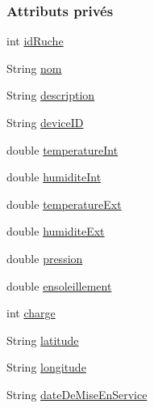 \subsubsection*{Attributs privés}
\begin{DoxyCompactItemize}
\item 
int \hyperlink{classfr_1_1campus_1_1laurainc_1_1honeybee_1_1_ruche_aee4d51dd1634b799427d89e168cdadf4}{id\+Ruche}
\item 
String \hyperlink{classfr_1_1campus_1_1laurainc_1_1honeybee_1_1_ruche_ae18dd003de10a89841422fd96b1139d7}{nom}
\item 
String \hyperlink{classfr_1_1campus_1_1laurainc_1_1honeybee_1_1_ruche_ae56a8481dac2ac5b127c0c9c62f00fe3}{description}
\item 
String \hyperlink{classfr_1_1campus_1_1laurainc_1_1honeybee_1_1_ruche_aa9f9b410923f3c8b037c2c359a67a132}{device\+ID}
\item 
double \hyperlink{classfr_1_1campus_1_1laurainc_1_1honeybee_1_1_ruche_aa8c8bbb640a5e445ca1d67f97e0f99b0}{temperature\+Int}
\item 
double \hyperlink{classfr_1_1campus_1_1laurainc_1_1honeybee_1_1_ruche_ad56a25b2e432592a20a5f7f4347f92f9}{humidite\+Int}
\item 
double \hyperlink{classfr_1_1campus_1_1laurainc_1_1honeybee_1_1_ruche_aabdc13a8650aed77ee5497236e79174b}{temperature\+Ext}
\item 
double \hyperlink{classfr_1_1campus_1_1laurainc_1_1honeybee_1_1_ruche_affacf72018828f470b5c69c1cc4f06a6}{humidite\+Ext}
\item 
double \hyperlink{classfr_1_1campus_1_1laurainc_1_1honeybee_1_1_ruche_a73ddf7686cdd056fe7dc4b249f6ada86}{pression}
\item 
double \hyperlink{classfr_1_1campus_1_1laurainc_1_1honeybee_1_1_ruche_aebfc51ed0e12be0dddc7675884a8129b}{ensoleillement}
\item 
int \hyperlink{classfr_1_1campus_1_1laurainc_1_1honeybee_1_1_ruche_adf68ff1828b2eaa02c8411a9c5727bf9}{charge}
\item 
String \hyperlink{classfr_1_1campus_1_1laurainc_1_1honeybee_1_1_ruche_a6898723eb97e6f32cbf2c63032f8aec4}{latitude}
\item 
String \hyperlink{classfr_1_1campus_1_1laurainc_1_1honeybee_1_1_ruche_a298a62f192d8f018fa5f4bd5b3d8c157}{longitude}
\item 
String \hyperlink{classfr_1_1campus_1_1laurainc_1_1honeybee_1_1_ruche_aba813c622e2de609b22d7d752da2c544}{date\+De\+Mise\+En\+Service}
\item 

\end{DoxyCompactItemize}
